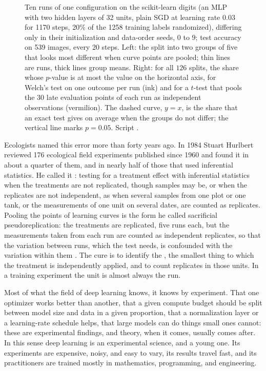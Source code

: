 \begin{refsection}
\begin{figure}[t]
\caption{Ten runs of one configuration on the scikit-learn digits (an MLP with two hidden layers of 32 units, plain SGD at learning rate $0.03$ for 1170 steps, 20\% of the 1258 training labels randomized), differing only in their initialization and data-order seeds, $0$ to $9$; test accuracy on 539 images, every 20 steps. Left: the split into two groups of five that looks most different when curve points are pooled; thin lines are runs, thick lines group means. Right: for all $126$ splits, the share whose $p$-value is at most the value on the horizontal axis, for Welch's test on one outcome per run (ink) and for a $t$-test that pools the $30$ late evaluation points of each run as independent observations (vermilion). The dashed curve, $y=x$, is the share that an exact test gives on average when the groups do not differ; the vertical line marks $p=0.05$. Script .}\label{fig:prologue:split}
\end{figure}

Ecologists named this error more than forty years ago. In 1984 Stuart Hurlbert reviewed 176 ecological field experiments published since 1960 and found it in about a quarter of them, and in nearly half of those that used inferential statistics. He called it : testing for a treatment effect with inferential statistics when the treatments are not replicated, though samples may be, or when the replicates are not independent, as when several samples from one plot or one tank, or the measurements of one unit on several dates, are counted as replicates. Pooling the points of learning curves is the form he called sacrificial pseudoreplication: the treatments are replicated, five runs each, but the measurements taken from each run are counted as independent replicates, so that the variation between runs, which the test needs, is confounded with the variation within them \parencite{Hurlbert1984}. The cure is to identify the , the smallest thing to which the treatment is independently applied, and to count replicates in those units. In a training experiment the unit is almost always the run.


Most of what the field of deep learning knows, it knows by experiment. That one optimizer works better than another, that a given compute budget should be split between model size and data in a given proportion, that a normalization layer or a learning-rate schedule helps, that large models can do things small ones cannot: these are experimental findings, and theory, when it comes, usually comes after. In this sense deep learning is an experimental science, and a young one. Its experiments are expensive, noisy, and easy to vary, its results travel fast, and its practitioners are trained mostly in mathematics, programming, and engineering.


\end{refsection}
